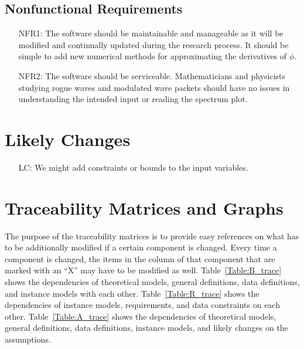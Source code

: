 \documentclass[12pt]{article}
\newcounter{lcnum} %
\begin{document}

\subsection{Nonfunctional Requirements}
\noindent \begin{itemize}
\item[NFR1:] The software should be maintainable and manageable as it will 
be modified and continually updated during the research process. It should be 
simple to add new numerical methods for approximating the derivatives of 
$\phi$.  
\item[NFR2:] The software should be serviceable. Mathematicians and physicists 
studying rogue waves and modulated wave packets should have no issues in 
understanding the intended input or reading the spectrum plot. 
\end{itemize}


\section{Likely Changes}    

\noindent \begin{itemize}

\item[LC\refstepcounter{lcnum}\thelcnum\label{LC_meaningfulLabel}:] We might 
add constraints or bounds to the input variables. 

\end{itemize}


\section{Traceability Matrices and Graphs}

The purpose of the traceability matrices is to provide easy references on what
has to be additionally modified if a certain component is changed.  Every time a
component is changed, the items in the column of that component that are marked
with an ``X'' may have to be modified as well.  Table~\ref{Table:B_trace} shows 
the
dependencies of theoretical models, general definitions, data definitions, and
instance models with each other. Table~\ref{Table:R_trace} shows the
dependencies of instance models, requirements, and data constraints on each
other. Table~\ref{Table:A_trace} shows the dependencies of theoretical models,
general definitions, data definitions, instance models, and likely changes on
the assumptions.\\
\end{document}
